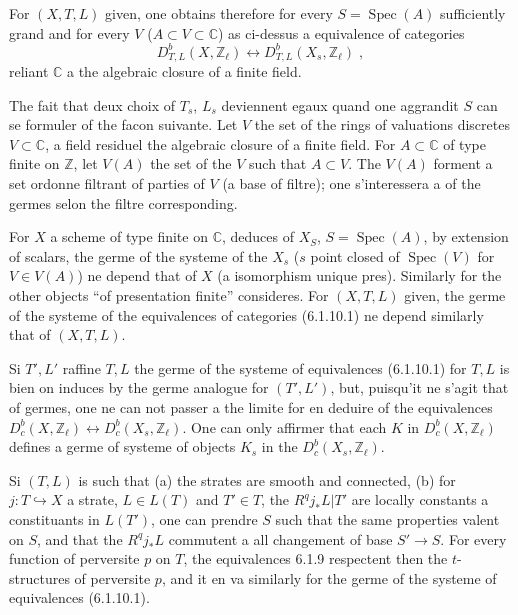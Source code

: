 \documentclass[12pt,a4paper]{article}
\theoremstyle{plain}
\theoremstyle{definition}
\theoremstyle{remark}
\DeclareMathOperator{\Spec}{Spec}
\newcommand{\CC}{\mathbb{C}}
\newcommand{\ZZ}{\mathbb{Z}}
\begin{document}
\subsubsection{}
For $(X, T, L)$ given, one obtains therefore for every $S = \Spec(A)$ sufficiently grand and for every $V$ ($A \subset V \subset \CC$) as ci-dessus a equivalence of categories
\begin{equation}\label{eq:6.1.10.1}
D^b_{T, L}(X, \ZZ_{\ell}) \longleftrightarrow D^b_{T, L}(X_s, \ZZ_{\ell})\;,
\end{equation}
reliant $\CC$ a the algebraic closure of a finite field.

The fait that deux choix of $T_s$, $L_s$ deviennent egaux quand one aggrandit $S$ can se formuler of the facon suivante. Let $V$ the set of the rings of valuations discretes $V \subset \CC$, a field residuel the algebraic closure of a finite field. For $A \subset \CC$ of type finite on $\ZZ$, let $V(A)$ the set of the $V$ such that $A \subset V$. The $V(A)$ forment a set ordonne filtrant of parties of $V$ (a base of filtre); one s'interessera a of the germes selon the filtre corresponding.

For $X$ a scheme of type finite on $\CC$, deduces of $X_S$, $S = \Spec(A)$, by extension of scalars, the germe of the systeme of the $X_s$ ($s$ point closed of $\Spec(V)$ for $V \in V(A)$) ne depend that of $X$ (a isomorphism unique pres). Similarly for the other objects ``of presentation finite'' consideres. For $(X, T, L)$ given, the germe of the systeme of the equivalences of categories (6.1.10.1) ne depend similarly that of $(X, T, L)$.

Si $T', L'$ raffine $T, L$ the germe of the systeme of equivalences (6.1.10.1) for $T, L$ is bien on induces by the germe analogue for $(T', L')$, but, puisqu'it ne s'agit that of germes, one ne can not passer a the limite for en deduire of the equivalences $D^b_c(X, \ZZ_{\ell}) \longleftrightarrow D^b_c(X_s, \ZZ_{\ell})$. One can only affirmer that each $K$ in $D^b_c(X, \ZZ_{\ell})$ defines a germe of systeme of objects $K_s$ in the $D^b_c(X_s, \ZZ_{\ell})$.

Si $(T, L)$ is such that (a) the strates are smooth and connected, (b) for $j: T \hookrightarrow X$ a strate, $L \in L(T)$ and $T' \in T$, the $R^qj_*L|T'$ are locally constants a constituants in $L(T')$, one can prendre $S$ such that the same properties valent on $S$, and that the $R^qj_*L$ commutent a all changement of base $S' \to S$. For every function of perversite $p$ on $T$, the equivalences 6.1.9 respectent then the $t$-structures of perversite $p$, and it en va similarly for the germe of the systeme of equivalences (6.1.10.1).
\end{document}
